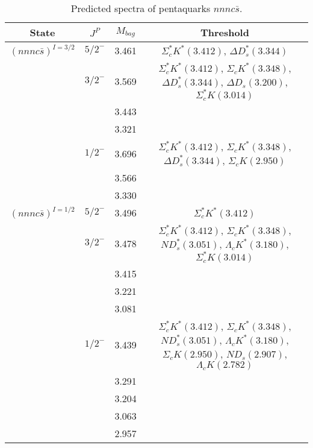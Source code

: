 \documentclass[prd,twocolumn,floatfix,nofootinbib]{revtex4}
\begin{document}
\renewcommand{\tabcolsep}{0.5cm}
\renewcommand{\arraystretch}{1.2}
\begin{table*}[!htbp]
    \caption{Predicted spectra of pentaquarks $nnnc\bar{s}$.}
    \begin{tabular}{cccc}
        \hline\hline
        {\rm State} &$J^{P}$ &$M_{bag}$ &Threshold \\ \hline
        ${(nnnc\bar{s})}^{I=3/2}$
            &${5/2}^{-}$    &3.461  &$\Sigma_{c}^{\ast}K^{\ast}(3.412)$, $\Delta D_{s}^{\ast}(3.344)$ \\
            &${3/2}^{-}$    &3.569  &$\Sigma_{c}^{\ast}K^{\ast}(3.412)$, $\Sigma_{c}K^{\ast}(3.348)$, $\Delta D_{s}^{\ast}(3.344)$, $\Delta D_{s}(3.200)$, $\Sigma_{c}^{\ast}K(3.014)$ \\
            &               &3.443  & \\
            &               &3.321  & \\
            &${1/2}^{-}$    &3.696  &$\Sigma_{c}^{\ast}K^{\ast}(3.412)$, $\Sigma_{c}K^{\ast}(3.348)$, $\Delta D_{s}^{\ast}(3.344)$, $\Sigma_{c}K(2.950)$ \\
            &               &3.566  & \\
            &               &3.330  & \\
        ${(nnnc\bar{s})}^{I=1/2}$
            &${5/2}^{-}$    &3.496  &$\Sigma_{c}^{\ast}K^{\ast}(3.412)$ \\
            &${3/2}^{-}$    &3.478  &$\Sigma_{c}^{\ast}K^{\ast}(3.412)$, $\Sigma_{c}K^{\ast}(3.348)$, $ND_{s}^{\ast}(3.051)$, $\Lambda_{c}K^{\ast}(3.180)$, $\Sigma_{c}^{\ast}K(3.014)$ \\
            &               &3.415  & \\
            &               &3.221  & \\
            &               &3.081  & \\
            &${1/2}^{-}$    &3.439  &$\Sigma_{c}^{\ast}K^{\ast}(3.412)$, $\Sigma_{c}K^{\ast}(3.348)$, $ND_{s}^{\ast}(3.051)$, $\Lambda_{c}K^{\ast}(3.180)$, $\Sigma_{c}K(2.950)$, $ND_{s}(2.907)$, $\Lambda_{c}K(2.782)$ \\
            &               &3.291  & \\
            &               &3.204  & \\
            &               &3.063  & \\
            &               &2.957  & \\
        \hline\hline
    \end{tabular}
\end{table*}
\end{document}
